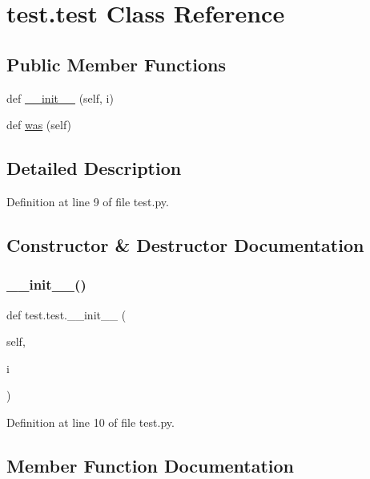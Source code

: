 \hypertarget{classtest_1_1test}{}\section{test.\+test Class Reference}
\label{classtest_1_1test}
\subsection*{Public Member Functions}
\begin{DoxyCompactItemize}
\item 
def \hyperlink{classtest_1_1test_a275ac6c39676eb81c64f165c9f9b2467}{\+\_\+\+\_\+init\+\_\+\+\_\+} (self, i)
\item 
def \hyperlink{classtest_1_1test_adee84dc04b4a15e8946ec05846a00d48}{was} (self)
\end{DoxyCompactItemize}


\subsection{Detailed Description}


Definition at line 9 of file test.\+py.



\subsection{Constructor \& Destructor Documentation}
\mbox{\label{classtest_1_1test_a275ac6c39676eb81c64f165c9f9b2467}} 
\subsubsection{\texorpdfstring{\+\_\+\+\_\+init\+\_\+\+\_\+()}{\_\_init\_\_()}}
{\footnotesize\ttfamily def test.\+test.\+\_\+\+\_\+init\+\_\+\+\_\+ (\begin{DoxyParamCaption}\item[{}]{self,  }\item[{}]{i }\end{DoxyParamCaption})}



Definition at line 10 of file test.\+py.



\subsection{Member Function Documentation}
\mbox{\label{classtest_1_1test_adee84dc04b4a15e8946ec05846a00d48}} 
